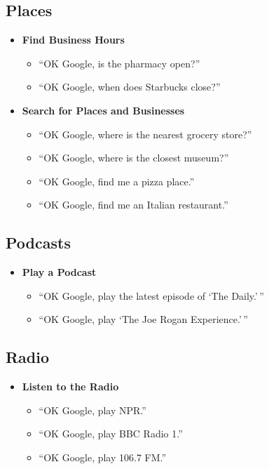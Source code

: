 \documentclass[
  jou,
  floatsintext,
  longtable,
  a4paper,
  nolmodern,
  notxfonts,
  notimes,
  colorlinks=true,linkcolor=blue,citecolor=blue,urlcolor=blue]{apa7}
\providecommand{\tightlist}{%
  \setlength{\itemsep}{0pt}\setlength{\parskip}{0pt}}
\begin{document}
\subsection{Places}\label{places}

\begin{itemize}
\tightlist
\item
  \textbf{Find Business Hours}

  \begin{itemize}
  \tightlist
  \item
    ``OK Google, is the pharmacy open?''
  \item
    ``OK Google, when does Starbucks close?''
  \end{itemize}
\item
  \textbf{Search for Places and Businesses}

  \begin{itemize}
  \tightlist
  \item
    ``OK Google, where is the nearest grocery store?''
  \item
    ``OK Google, where is the closest museum?''
  \item
    ``OK Google, find me a pizza place.''
  \item
    ``OK Google, find me an Italian restaurant.''
  \end{itemize}
\end{itemize}

\subsection{Podcasts}\label{podcasts}

\begin{itemize}
\tightlist
\item
  \textbf{Play a Podcast}

  \begin{itemize}
  \tightlist
  \item
    ``OK Google, play the latest episode of `The Daily.'\,''
  \item
    ``OK Google, play `The Joe Rogan Experience.'\,''
  \end{itemize}
\end{itemize}

\subsection{Radio}\label{radio}

\begin{itemize}
\tightlist
\item
  \textbf{Listen to the Radio}

  \begin{itemize}
  \tightlist
  \item
    ``OK Google, play NPR.''
  \item
    ``OK Google, play BBC Radio 1.''
  \item
    ``OK Google, play 106.7 FM.''
  \end{itemize}
\end{itemize}
\end{document}
